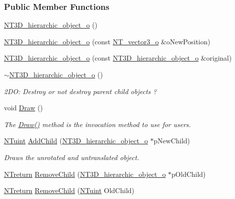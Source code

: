 \subsubsection*{Public Member Functions}
\begin{DoxyCompactItemize}
\item 
\hyperlink{class_n_t3_d__hierarchic__object__o_a5c8604bec5dd9592cd806a3fd3b5047b}{NT3D\_\-hierarchic\_\-object\_\-o} ()
\item 
\hyperlink{class_n_t3_d__hierarchic__object__o_a04714c33dda282a59e63693a36274f9a}{NT3D\_\-hierarchic\_\-object\_\-o} (const \hyperlink{class_n_t__vector3__o}{NT\_\-vector3\_\-o} \&oNewPosition)
\item 
\hyperlink{class_n_t3_d__hierarchic__object__o_a0ab55db17079e2de7f0881e37e20b753}{NT3D\_\-hierarchic\_\-object\_\-o} (const \hyperlink{class_n_t3_d__hierarchic__object__o}{NT3D\_\-hierarchic\_\-object\_\-o} \&original)
\item 
\hyperlink{class_n_t3_d__hierarchic__object__o_a01af84ea4913ff392a153b9e7c32b0f8}{$\sim$NT3D\_\-hierarchic\_\-object\_\-o} ()
\begin{DoxyCompactList}\small\item\em 2DO: Destroy or not destroy parent child objects ? \item\end{DoxyCompactList}\item 
void \hyperlink{class_n_t3_d__hierarchic__object__o_afc8ed0ce09d81e63a875da4dfc9200a2}{Draw} ()
\begin{DoxyCompactList}\small\item\em The \hyperlink{class_n_t3_d__hierarchic__object__o_afc8ed0ce09d81e63a875da4dfc9200a2}{Draw()} method is the invocation method to use for users. \item\end{DoxyCompactList}\item 
\hyperlink{nt__types_8h_ac503559f358539d91155f135ee7a365d}{NTuint} \hyperlink{class_n_t3_d__hierarchic__object__o_a48677e2fd058029e1dc80e8cef8b4358}{AddChild} (\hyperlink{class_n_t3_d__hierarchic__object__o}{NT3D\_\-hierarchic\_\-object\_\-o} $\ast$pNewChild)
\begin{DoxyCompactList}\small\item\em Draws the unrotated and untranslated object. \item\end{DoxyCompactList}\item 
\hyperlink{nt__types_8h_ab9564ee8f091e809d21b8451c6683c53}{NTreturn} \hyperlink{class_n_t3_d__hierarchic__object__o_a2aa5df6fc0bb2581fb6b20956e914857}{RemoveChild} (\hyperlink{class_n_t3_d__hierarchic__object__o}{NT3D\_\-hierarchic\_\-object\_\-o} $\ast$pOldChild)
\item 
\hyperlink{nt__types_8h_ab9564ee8f091e809d21b8451c6683c53}{NTreturn} \hyperlink{class_n_t3_d__hierarchic__object__o_a5449c5c85951c427fbe2aca0b9d48bb4}{RemoveChild} (\hyperlink{nt__types_8h_ac503559f358539d91155f135ee7a365d}{NTuint} OldChild)
\end{DoxyCompactItemize}
